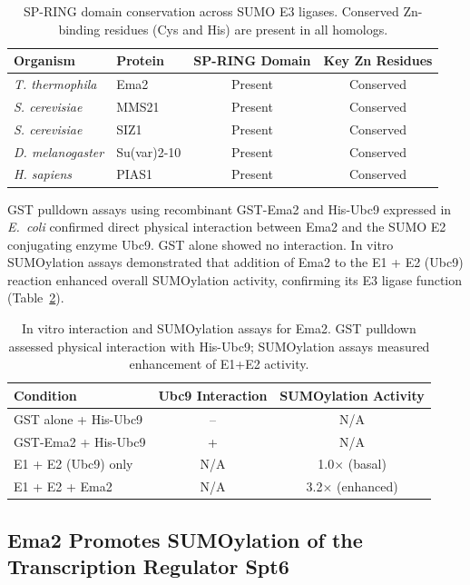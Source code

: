 \documentclass[11pt]{article}
\begin{document}
\begin{table}[H]
\centering
\caption{SP-RING domain conservation across SUMO E3 ligases. Conserved Zn-binding residues (Cys and His) are present in all homologs.}
\label{tab:spring}
\begin{tabular}{llcc}
\toprule
\textbf{Organism} & \textbf{Protein} & \textbf{SP-RING Domain} & \textbf{Key Zn Residues} \\
\midrule
\textit{T. thermophila} & Ema2 & Present & Conserved \\
\textit{S. cerevisiae} & MMS21 & Present & Conserved \\
\textit{S. cerevisiae} & SIZ1 & Present & Conserved \\
\textit{D. melanogaster} & Su(var)2-10 & Present & Conserved \\
\textit{H. sapiens} & PIAS1 & Present & Conserved \\
\bottomrule
\end{tabular}
\end{table}

GST pulldown assays using recombinant GST-Ema2 and His-Ubc9 expressed in \textit{E.~coli} confirmed direct physical interaction between Ema2 and the SUMO E2 conjugating enzyme Ubc9. GST alone showed no interaction. In vitro SUMOylation assays demonstrated that addition of Ema2 to the E1 + E2 (Ubc9) reaction enhanced overall SUMOylation activity, confirming its E3 ligase function (Table~\ref{tab:interaction}).

\begin{table}[H]
\centering
\caption{In vitro interaction and SUMOylation assays for Ema2. GST pulldown assessed physical interaction with His-Ubc9; SUMOylation assays measured enhancement of E1+E2 activity.}
\label{tab:interaction}
\begin{tabular}{lcc}
\toprule
\textbf{Condition} & \textbf{Ubc9 Interaction} & \textbf{SUMOylation Activity} \\
\midrule
GST alone + His-Ubc9 & -- & N/A \\
GST-Ema2 + His-Ubc9 & + & N/A \\
E1 + E2 (Ubc9) only & N/A & 1.0$\times$ (basal) \\
E1 + E2 + Ema2 & N/A & 3.2$\times$ (enhanced) \\
\bottomrule
\end{tabular}
\end{table}

\subsection{Ema2 Promotes SUMOylation of the Transcription Regulator Spt6}
\end{document}
